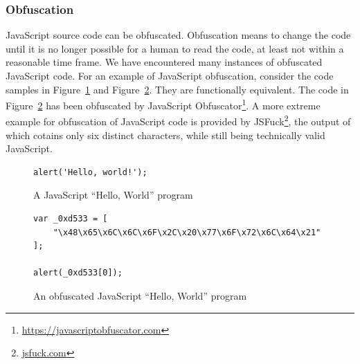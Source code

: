 \documentclass[
    fontsize=12pt,
    headings=small,
    parskip=half,
    bibliography=totoc,
    numbers=noenddot,
    open=any
    ]{scrreprt}
\begin{document}
\subsubsection{Obfuscation}
\label{fundamentals:obfuscation}
JavaScript source code can be obfuscated. Obfuscation means to change the code
until it is no longer possible for a human to read the code, at least not within
a reasonable time frame. We have encountered many instances of obfuscated JavaScript
code. For an example of JavaScript obfuscation, consider the code samples in
Figure~\ref{code:javascript_hello_world} and Figure~\ref{code:javascript_obfuscated}.
They are functionally equivalent. The code in Figure~\ref{code:javascript_obfuscated}
has been obfuscated by JavaScript Obfuscator\footnote{\url{https://javascriptobfuscator.com}}.
A more extreme example for obfuscation of JavaScript code is provided by JSFuck\footnote{\url{jsfuck.com}},
the output of which cotains only six distinct characters, while still being technically valid JavaScript.

\begin{figure}
\centering
\begin{verbatim}
alert('Hello, world!');
\end{verbatim}
\caption{A JavaScript ``Hello, World'' program}
\label{code:javascript_hello_world}
\end{figure}

\begin{figure}
\centering
\begin{verbatim}
var _0xd533 = [
    "\x48\x65\x6C\x6C\x6F\x2C\x20\x77\x6F\x72\x6C\x64\x21"
];

alert(_0xd533[0]);
\end{verbatim}
\caption{An obfuscated JavaScript ``Hello, World'' program}
\label{code:javascript_obfuscated}
\end{figure}
\end{document}
